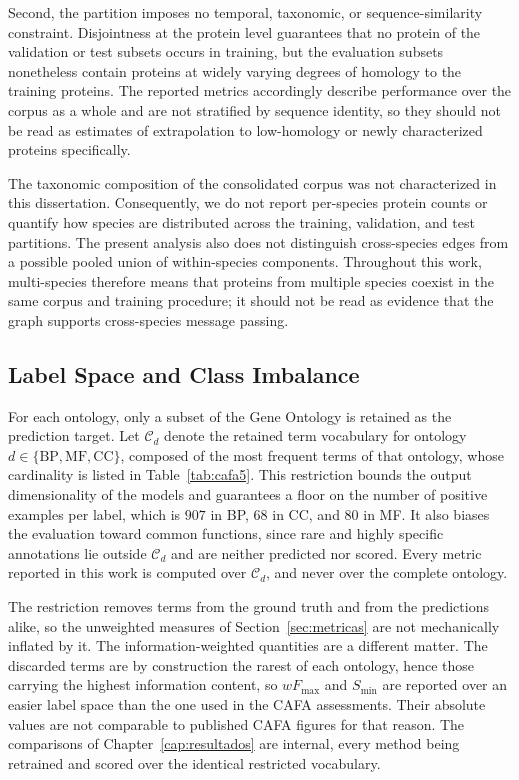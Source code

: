\documentclass[Ingles]{ic-tese-v3}
\begin{document}
Second, the partition imposes no temporal, taxonomic, or sequence-similarity
constraint. Disjointness at the protein level guarantees that no protein of the
validation or test subsets occurs in training, but the evaluation subsets
nonetheless contain proteins at widely varying degrees of homology to the
training proteins. The reported metrics accordingly describe performance over the
corpus as a whole and are not stratified by sequence identity, so they should not
be read as estimates of extrapolation to low-homology or newly characterized
proteins specifically.

The taxonomic composition of the consolidated corpus was not characterized in this dissertation. Consequently, we do not report per-species protein counts or quantify how species are distributed across the training, validation, and test partitions. The present analysis also does not distinguish cross-species edges from a possible pooled union of within-species components. Throughout this work, multi-species therefore means that proteins from multiple species coexist in the same corpus and training procedure; it should not be read as evidence that the graph supports cross-species message passing.%


\subsection{Label Space and Class Imbalance}
\label{subsec:rotulos}

For each ontology, only a subset of the Gene Ontology is retained as the
prediction target. Let $\mathcal{C}_d$ denote the retained term vocabulary for
ontology $d \in \{\mathrm{BP}, \mathrm{MF}, \mathrm{CC}\}$, composed of the most
frequent terms of that ontology, whose cardinality is listed in
Table~\ref{tab:cafa5}. This restriction bounds the output dimensionality of the
models and guarantees a floor on the number of positive examples per label, which
is $907$ in BP, $68$ in CC, and $80$ in MF. It also biases the evaluation toward
common functions, since rare and highly specific annotations lie outside
$\mathcal{C}_d$ and are neither predicted nor scored. Every metric reported in
this work is computed over $\mathcal{C}_d$, and never over the complete ontology.

The restriction removes terms from the ground truth and from the predictions
alike, so the unweighted measures of Section~\ref{sec:metricas} are not
mechanically inflated by it. The information-weighted quantities are a different
matter. The discarded terms are by construction the rarest of each ontology,
hence those carrying the highest information content, so $wF_{\max}$ and
$S_{\min}$ are reported over an easier label space than the one used in the CAFA
assessments. Their absolute values are not comparable to published CAFA figures
for that reason. The comparisons of Chapter~\ref{cap:resultados} are internal,
every method being retrained and scored over the identical restricted vocabulary.
\end{document}
